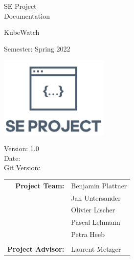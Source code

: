 \begin{titlepage}

    \begin{center}


        \vspace{1 cm}

        {\Large SE Project \\ Documentation} \\

        \vspace{0.5cm}

        {\Huge KubeWatch}

        \vspace{0.5cm}

        Semester: Spring 2022

        \vspace{0.5 cm}

        \includegraphics[height=4cm]{resources/se-project-logo.png}

        \vspace{0.5 cm}

        Version: 1.0 \\
        Date: \DTMnow \\
        Git Version: \gitDescription
        \vspace{1 cm}

        \begin{tabular}{rl}
            \textbf{Project Team:}    & Benjamin Plattner \\
                                      & Jan Untersander \\
                                      & Olivier Lischer \\
                                      & Pascal Lehmann \\
                                      & Petra Heeb \\
                                      &                    \\
            \textbf{Project Advisor:} & Laurent Metzger
        \end{tabular}


\end{center}
\end{titlepage}
